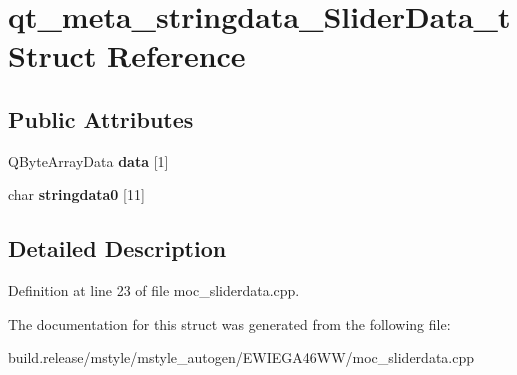 \hypertarget{structqt__meta__stringdata___slider_data__t}{}\section{qt\+\_\+meta\+\_\+stringdata\+\_\+\+Slider\+Data\+\_\+t Struct Reference}
\label{structqt__meta__stringdata___slider_data__t}
\subsection*{Public Attributes}
\begin{DoxyCompactItemize}
\item 
\mbox{\label{structqt__meta__stringdata___slider_data__t_ae0ce207ddc010a33e98f806742113965}} 
Q\+Byte\+Array\+Data {\bfseries data} \mbox{[}1\mbox{]}
\item 
\mbox{\label{structqt__meta__stringdata___slider_data__t_a3b2f5cc0ed4c27008b1172956ed0cf1e}} 
char {\bfseries stringdata0} \mbox{[}11\mbox{]}
\end{DoxyCompactItemize}


\subsection{Detailed Description}


Definition at line 23 of file moc\+\_\+sliderdata.\+cpp.



The documentation for this struct was generated from the following file\+:\begin{DoxyCompactItemize}
\item 
build.\+release/mstyle/mstyle\+\_\+autogen/\+E\+W\+I\+E\+G\+A46\+W\+W/moc\+\_\+sliderdata.\+cpp\end{DoxyCompactItemize}
